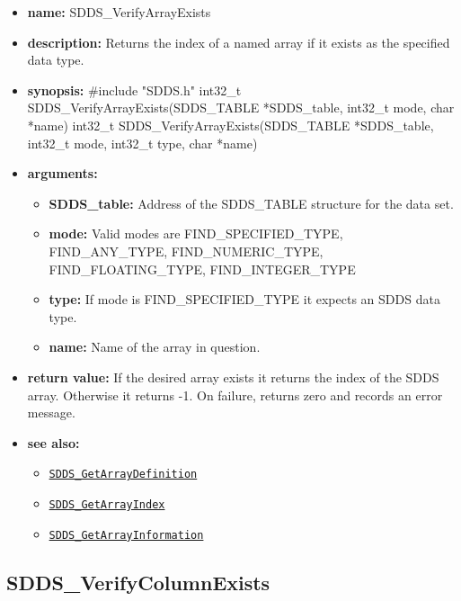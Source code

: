 \documentclass[11pt]{article}
\newcommand{\progref}[1]{\hyperref[SDDS_#1]{\tt SDDS\_#1}}
\begin{document}
\begin{itemize}
\item {\bf name:}\newline
SDDS\_VerifyArrayExists
\item {\bf description:}\newline
Returns the index of a named array if it exists as the specified data type.
\item {\bf synopsis:} \#include "SDDS.h"\newline
int32\_t SDDS\_VerifyArrayExists(SDDS\_TABLE *SDDS\_table, int32\_t mode, char *name)
int32\_t SDDS\_VerifyArrayExists(SDDS\_TABLE *SDDS\_table, int32\_t mode, int32\_t type, char *name)
\item {\bf arguments:}
\begin{itemize}
\item {\bf SDDS\_table:} Address of the SDDS\_TABLE structure for the data set.
\item {\bf mode:} Valid modes are FIND\_SPECIFIED\_TYPE, FIND\_ANY\_TYPE, FIND\_NUMERIC\_TYPE, FIND\_FLOATING\_TYPE, FIND\_INTEGER\_TYPE
\item {\bf type:} If mode is FIND\_SPECIFIED\_TYPE it expects an SDDS data type.
\item {\bf name:} Name of the array in question.
\end{itemize}
\item {\bf return value:}\newline
If the desired array exists it returns the index of the SDDS array. Otherwise it returns -1.\newline
\newline
On failure, returns zero and records an error message. 
\item {\bf see also:}
\begin{itemize}
\item \progref{GetArrayDefinition}
\item \progref{GetArrayIndex}
\item \progref{GetArrayInformation}
\end{itemize}
\end{itemize}

\subsection{SDDS\_VerifyColumnExists}
\label{SDDS_VerifyColumnExists}
\end{document}
